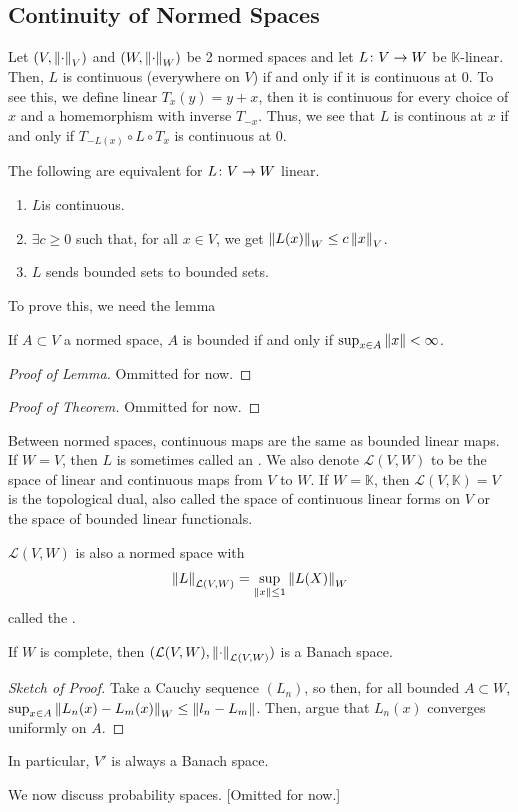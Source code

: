 \documentclass[11pt,leqno,oneside]{amsbook}
\numberwithin{thm}{section}
\newcommand{\cL}{\mathcal{L}}
\newcommand{\K}{\mathbb{K}} %
\begin{document}
  \subsection{Continuity of Normed Spaces}
  \begin{rmk}
    Let \((V,\norm_V)\) and \((W,\norm_W)\) be 2 normed spaces and let
    \(L \from V \to W\) be \(\K\)-linear. Then, \(L\) is continuous
    (everywhere on \(V\)) if and only if it is continuous at
    0. To see this, we define linear \(T_x(y) = y+x\), then it is
    continuous for every choice of \(x\) and a homemorphism with
    inverse \(T_{-x}\). Thus, we see that \(L\) is continous at \(x\)
    if and only if \(T_{-L(x)} \circ L \circ T_x\) is continuous at
    \(0\). 
  \end{rmk}
  \begin{prop}
    The following are equivalent for \(L \from V \to W\) linear.
    \begin{enumerate}
    \item \(L\)is continuous.
    \item \(\exists c \geq 0\) such that, for all \(x \in V\), we get
      \(\norm[L(x)]_W \leq c \norm[x]_V\).
    \item \(L\) sends bounded sets to bounded sets.
    \end{enumerate}
  \end{prop}
  To prove this, we need the lemma
  \begin{lem}
    If \(A \subset V\) a normed space, \(A\) is bounded if and only if
    \(\sup_{x \in A} \norm[x] < \infty\).
  \end{lem}
  \begin{proof}[Proof of Lemma]
    Ommitted for now.
  \end{proof}
  \begin{proof}[Proof of Theorem]
    Ommitted for now.
  \end{proof}
  Between normed spaces, continuous maps are the same as bounded
  linear maps. If \(W = V\), then \(L\) is sometimes called an
  . We also denote \(\cL(V,W)\) to be the space of linear
  and continuous maps from \(V\) to \(W\). If \(W = \K\), then
  \(\cL(V,\K)=V\) is the topological dual, also called the space of
  continuous linear forms on \(V\) or the space of bounded linear
  functionals.
  \begin{prop}
    \(\cL(V,W)\) is also a normed space with \[
      \norm[L]_{\cL(V,W)} = \sup_{\norm[x] \leq 1} \norm[L(X)]_W
    \]
    called the . 
  \end{prop}
  \begin{thm}
    If \(W\) is complete, then \((\cL(V,W),\norm_{\cL(V,W)})\) is a
    Banach space.
  \end{thm}
  \begin{proof}[Sketch of Proof]
    Take a Cauchy sequence \((L_n)\), so then, for all bounded \(A
    \subset W\), \(\sup_{x \in A} \norm[L_n(x) - L_m(x)]_W \leq
    \norm[l_n - L_m]\). Then, argue that \(L_n(x)\) converges
    uniformly on \(A\).
  \end{proof}
  In particular, \(V'\) is always a Banach space.
  \begin{example}
    We now discuss probability spaces. [Omitted for now.]
  \end{example}
\end{document}
